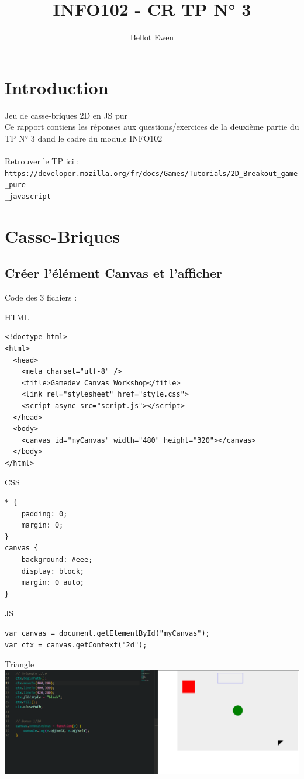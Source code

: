 \documentclass[12pt]{exam}
\title{INFO102 - CR TP N° 3 }
\author{Bellot Ewen}
\date{}
\begin{document}
\maketitle
\thispagestyle{head}
\noindent
\tableofcontents
\newpage

\section*{Introduction}
Jeu de casse-briques 2D en JS pur\\
Ce rapport contiens les réponses aux questions/exercices de la deuxième partie du TP N° 3 dand le cadre du module INFO102\\\\
Retrouver le TP ici :\\
\verb|https://developer.mozilla.org/fr/docs/Games/Tutorials/2D_Breakout_game_pure|\\
\verb|_javascript|



\section{Casse-Briques}
\subsection{Créer l'élément Canvas et l'afficher}
Code des 3 fichiers :

\noindent
HTML
\begin{verbatim}
<!doctype html>
<html>
  <head>
    <meta charset="utf-8" />
    <title>Gamedev Canvas Workshop</title>
    <link rel="stylesheet" href="style.css">
    <script async src="script.js"></script>
  </head>
  <body>
    <canvas id="myCanvas" width="480" height="320"></canvas>
  </body>
</html>
\end{verbatim}

\noindent
CSS
\begin{verbatim}
* {
    padding: 0;
    margin: 0;
}
canvas {
    background: #eee;
    display: block;
    margin: 0 auto;
}
\end{verbatim}

\noindent
JS
\begin{verbatim}
var canvas = document.getElementById("myCanvas");
var ctx = canvas.getContext("2d");
\end{verbatim}

\noindent
Triangle\\
\includegraphics[width=\linewidth]{triangle.png}
\end{document}
